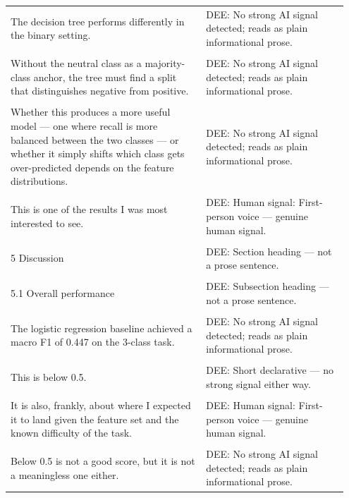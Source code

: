 \documentclass[11pt]{article}
\begin{document}
\begin{longtable}{|p{0.55\linewidth}|p{0.40\linewidth}|}
\hline
\rule{0pt}{3.5cm} & \\
\hline
The decision tree performs differently in the binary setting. & DEE: No strong AI signal detected; reads as plain informational prose. \\[2pt]
\hline
\rule{0pt}{3.5cm} & \\
\hline
Without the neutral class as a majority-class anchor, the tree must find a split that distinguishes negative from positive. & DEE: No strong AI signal detected; reads as plain informational prose. \\[2pt]
\hline
\rule{0pt}{3.5cm} & \\
\hline
Whether this produces a more useful model --- one where recall is more balanced between the two classes --- or whether it simply shifts which class gets over-predicted depends on the feature distributions. & DEE: No strong AI signal detected; reads as plain informational prose. \\[2pt]
\hline
\rule{0pt}{3.5cm} & \\
\hline
This is one of the results I was most interested to see. & DEE: Human signal: First-person voice --- genuine human signal. \\[2pt]
\hline
\rule{0pt}{3.5cm} & \\
\hline
5 Discussion & DEE: Section heading --- not a prose sentence. \\[2pt]
\hline
\rule{0pt}{3.5cm} & \\
\hline
5.1 Overall performance & DEE: Subsection heading --- not a prose sentence. \\[2pt]
\hline
\rule{0pt}{3.5cm} & \\
\hline
The logistic regression baseline achieved a macro F1 of 0.447 on the 3-class task. & DEE: No strong AI signal detected; reads as plain informational prose. \\[2pt]
\hline
\rule{0pt}{3.5cm} & \\
\hline
This is below 0.5. & DEE: Short declarative --- no strong signal either way. \\[2pt]
\hline
\rule{0pt}{3.5cm} & \\
\hline
It is also, frankly, about where I expected it to land given the feature set and the known difficulty of the task. & DEE: Human signal: First-person voice --- genuine human signal. \\[2pt]
\hline
\rule{0pt}{3.5cm} & \\
\hline
Below 0.5 is not a good score, but it is not a meaningless one either. & DEE: No strong AI signal detected; reads as plain informational prose. \\[2pt]

\end{longtable}
\end{document}
